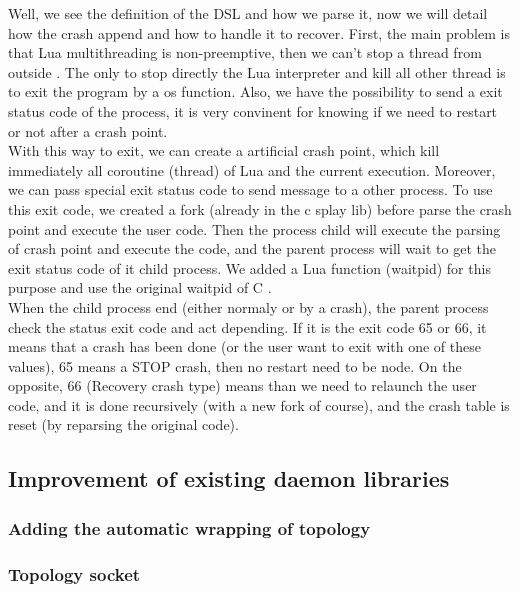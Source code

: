 \documentclass{eplmastersthesis}
\begin{document}
        Well, we see the definition of the DSL and how we parse it, now we will detail how the crash append and how 
        to handle it to recover. First, the main problem is that Lua multithreading is non-preemptive, then we can't 
        stop a thread from outside \cite{CoroutineLua}. The only to stop directly the Lua interpreter and kill all other
        thread is to exit the program by a os function. Also, we have the possibility to send a exit status code of the 
        process, it is very convinent for knowing if we need to restart or not after a crash point. \\

        With this way to exit, we can create a artificial crash point, which kill immediately all coroutine (thread)
        of Lua and the current execution. Moreover, we can pass special exit status code to send message to a other process.
        To use this exit code, we created a fork (already in the c splay lib) before parse the crash point and execute the user code.
        Then the process child will execute the parsing of crash point and execute the code, and the parent process will wait 
        to get the exit status code of it child process. We added a Lua function (waitpid) for this purpose and use the 
        original waitpid of C \cite{waitpid}. \\

        When the child process end (either normaly or by a crash), the parent process check the status exit code and act depending.
        If it is the exit code 65 or 66, it means that a crash has been done (or the user want to exit with one of these values), 
        65 means a STOP crash, then no restart need to be node. On the opposite, 66 (Recovery crash type) means than we need to
        relaunch the user code,
        and it is done recursively (with a new fork of course), and the crash table is reset (by reparsing the original code).

      \subsection{Improvement of existing daemon libraries}

        \subsubsection{Adding the automatic wrapping of topology}

        \subsubsection{Topology socket}
\end{document}
